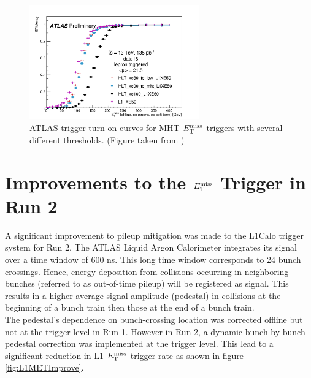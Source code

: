 \begin{figure}[h!]
  \begin{center}
    \includegraphics[width=0.65\textwidth]{figures/trigger/2016-05-16-UpdatedTurnOns.png}\hspace{0.05\textwidth}
\end{center}
\caption{ATLAS trigger turn on curves for MHT $E_{\mathrm{T}}^{\mathrm{miss}}$ triggers with several different thresholds. (Figure taken from \cite{Trigger2016})}
\label{fig:trigTurnON} 
\end{figure}

\section{Improvements to the $E_{\mathrm{T}}^{\mathrm{miss}}$ Trigger in Run 2}
\label{sec:trig:improvements}

\indent A significant improvement to pileup mitigation was made to the L1Calo trigger system for Run 2.\cite{Trigger2015}  The ATLAS Liquid Argon Calorimeter integrates its signal over a time window of $600$ ns.  This long time window corresponds to 24 bunch crossings.  Hence, energy deposition from collisions occurring in neighboring bunches (referred to as out-of-time pileup) will be registered as signal.  This results in a higher average signal amplitude (pedestal) in collisions at the beginning of a bunch train then those at the end of a bunch train.  \\

\indent The pedestal's dependence on bunch-crossing location was corrected offline but not at the trigger level in Run 1.  However in Run 2, a dynamic bunch-by-bunch pedestal correction was implemented at the trigger level.  This lead to a significant reduction in L1 $E_{\mathrm{T}}^{\mathrm{miss}}$ trigger rate as shown in figure \ref{fig:L1METImprove}. \\

